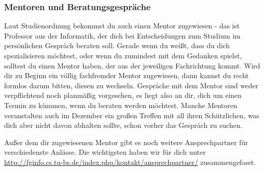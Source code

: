 \subsubsection{Mentoren und Beratungsgespräche}
Laut Studienordnung bekommst du auch einen Mentor zugewiesen - das ist Professor aus der Informatik, der dich bei Entscheidungen zum Studium im persönlichen Gespräch beraten soll. Gerade wenn du weißt, dass du dich spezialisieren möchtest, oder wenn du zumindest mit dem Gedanken spielst, solltest du einen Mentor haben, der aus der jeweiligen Fachrichtung kommt. Wird dir zu Beginn ein völlig fachfremder Mentor zugewiesen, dann kannst du recht formlos darum bitten, diesen zu wechseln. Gespräche mit dem Mentor sind weder verpflichtend noch planmäßig vorgesehen, es liegt also an dir, dich um einen Termin zu kümmen, wenn du beraten werden möchtest. Manche Mentoren veranstalten auch im Dezember ein großen Treffen mit all ihren Schützlichen, was dich aber nicht davon abhalten sollte, schon vorher das Gespräch zu suchen.

Außer dem dir zugewiesenen Mentor gibt es noch weitere Ansprechpartner
für verschiedenste Anlässe. Die wichtigsten haben wir für dich unter
\url{http://fginfo.cs.tu-bs.de/index.php/kontakt/ansprechpartner/}
zusammengefasst.

